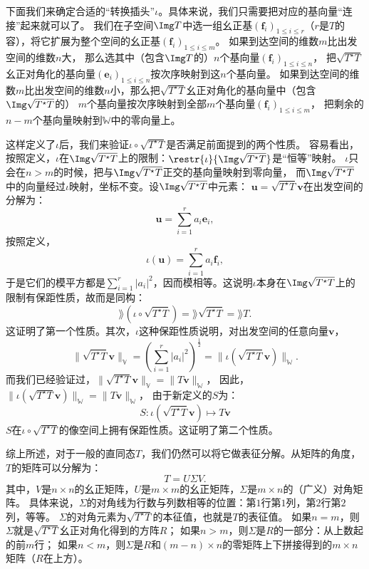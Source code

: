 \documentclass[12pt,UTF8,fontset=none]{ctexbook}
\begin{document}
下面我们来确定合适的“转换插头”$\iota$。具体来说，我们只需要把对应的基向量“连接”起来就可以了。
我们在子空间$\Img T$中选一组幺正基$(\mathbf{f}_i)_{1 \leqslant i \leqslant r}$（$r$是$T$的容），将它扩展为整个空间的幺正基$(\mathbf{f}_i)_{1 \leqslant i \leqslant m}$。
如果到达空间的维数$m$比出发空间的维数$n$大，
那么选其中（包含$\Img T$的）$n$个基向量$(\mathbf{f}_i)_{1 \leqslant i \leqslant n}$，
把$\sqrt{T^\star T}$幺正对角化的基向量$(\mathbf{e}_i)_{1 \leqslant i \leqslant n}$按次序映射到这$n$个基向量。
如果到达空间的维数$m$比出发空间的维数$n$小，那么把$\sqrt{T^\star T}$幺正对角化的基向量中（包含$\Img \sqrt{T^\star T}$的）
$m$个基向量按次序映射到全部$m$个基向量$(\mathbf{f}_i)_{1 \leqslant i \leqslant m}$，
把剩余的$n-m$个基向量映射到$\mathbb{W}$中的零向量上。

这样定义了$\iota$后，我们来验证$\iota \circ \sqrt{T^\star T}$是否满足前面提到的两个性质。
容易看出，按照定义，$\iota$在$\Img \sqrt{T^\star T}$上的限制：$\restr{\iota}{\Img \sqrt{T^\star T}}$是“恒等”映射。
$\iota$只会在$n>m$的时候，把与$\Img \sqrt{T^\star T}$正交的基向量映射到零向量，
而$\Img \sqrt{T^\star T}$中的向量经过$\iota$映射，坐标不变。设$\Img \sqrt{T^\star T}$中元素：
$\mathbf{u} = \sqrt{T^\star T} \mathbf{v}$在出发空间的分解为：
$$ \mathbf{u} = \sum_{i=1}^r a_i \mathbf{e}_i,$$
按照定义，
$$ \iota\left(\mathbf{u}\right) = \sum_{i=1}^r a_i \mathbf{f}_i,$$
于是它们的模平方都是$\sum_{i=1}^r |a_i|^2$，因而模相等。这说明$\iota$本身在$\Img \sqrt{T^\star T}$上的限制有保距性质，故而是同构：
$$\rang \left(\iota\circ\sqrt{T^\star T}\right) = \rang \sqrt{T^\star T} = \rang T.$$
这证明了第一个性质。其次，$\iota$这种保距性质说明，对出发空间的任意向量$\mathbf{v}$，
$$\|\sqrt{T^\star T} \mathbf{v} \|_\mathbb{V} = \left(\sum_{i=1}^r |a_i|^2\right)^{\frac12} = \|\iota\left(\sqrt{T^\star T} \mathbf{v}\right) \|_\mathbb{W}.$$
而我们已经验证过，$\|\sqrt{T^\star T} \mathbf{v} \|_\mathbb{V} = \|T \mathbf{v} \|_\mathbb{W}$，
因此，$\| \iota\left(\sqrt{T^\star T} \mathbf{v}\right) \|_\mathbb{W} = \|T \mathbf{v} \|_\mathbb{W}$，
由于新定义的$S$为：
$$ S : \iota\left(\sqrt{T^\star T} \mathbf{v}\right) \mapsto T \mathbf{v}$$
$S$在$\iota \circ \sqrt{T^\star T}$的像空间上拥有保距性质。这证明了第二个性质。

综上所述，对于一般的直同态$T$，我们仍然可以将它做表征分解。从矩阵的角度，$T$的矩阵可以分解为：
$$ T = U \Sigma V.$$
其中，$V$是$n \times n$的幺正矩阵，$U$是$m \times m$的幺正矩阵，$\Sigma$是$m \times n$的（广义）对角矩阵。
具体来说，$\Sigma$的对角线为行数与列数相等的位置：第$1$行第$1$列，第$2$行第$2$列，等等。
$\Sigma$的对角元素为$\sqrt{T^\star T}$的本征值，也就是$T$的表征值。
如果$n=m$，则$\Sigma$就是$\sqrt{T^\star T}$幺正对角化得到的方阵$R$；
如果$n>m$，则$\Sigma$是$R$的一部分：从上数起的前$m$行；
如果$n<m$，则$\Sigma$是$R$和$(m-n) \times n$的零矩阵上下拼接得到的$m\times n$矩阵（$R$在上方）。
\end{document}
